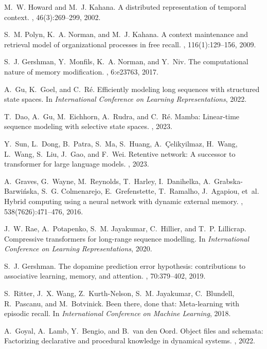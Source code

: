 \documentclass[11pt]{article}
\begin{document}

\begin{thebibliography}{20}

M.~W. Howard and M.~J. Kahana.
\newblock A distributed representation of temporal context.
, 46(3):269--299, 2002.

S.~M. Polyn, K.~A. Norman, and M.~J. Kahana.
\newblock A context maintenance and retrieval model of organizational processes in free recall.
, 116(1):129--156, 2009.

S.~J. Gershman, Y.~Monfils, K.~A. Norman, and Y.~Niv.
\newblock The computational nature of memory modification.
, 6:e23763, 2017.

A.~Gu, K.~Goel, and C.~R{\'e}.
\newblock Efficiently modeling long sequences with structured state spaces.
\newblock In {\em International Conference on Learning Representations}, 2022.

T.~Dao, A.~Gu, M.~Eichhorn, A.~Rudra, and C.~R{\'e}.
\newblock Mamba: Linear-time sequence modeling with selective state spaces.
, 2023.

Y.~Sun, L.~Dong, B.~Patra, S.~Ma, S.~Huang, A.~Çelikyilmaz, H.~Wang, L.~Wang, S.~Liu, J.~Gao, and F.~Wei.
\newblock Retentive network: A successor to transformer for large language models.
, 2023.

A.~Graves, G.~Wayne, M.~Reynolds, T.~Harley, I.~Danihelka, A.~Grabska-Barwińska, S.~G. Colmenarejo, E.~Grefenstette, T.~Ramalho, J.~Agapiou, et~al.
\newblock Hybrid computing using a neural network with dynamic external memory.
, 538(7626):471--476, 2016.

J.~W. Rae, A.~Potapenko, S.~M. Jayakumar, C.~Hillier, and T.~P. Lillicrap.
\newblock Compressive transformers for long-range sequence modelling.
\newblock In {\em International Conference on Learning Representations}, 2020.

S.~J. Gershman.
\newblock The dopamine prediction error hypothesis: contributions to associative learning, memory, and attention.
, 70:379--402, 2019.

S.~Ritter, J.~X. Wang, Z.~Kurth-Nelson, S.~M. Jayakumar, C.~Blundell, R.~Pascanu, and M.~Botvinick.
\newblock Been there, done that: Meta-learning with episodic recall.
\newblock In {\em International Conference on Machine Learning}, 2018.

A.~Goyal, A.~Lamb, Y.~Bengio, and B.~van den Oord.
\newblock Object files and schemata: Factorizing declarative and procedural knowledge in dynamical systems.
, 2022.

\end{thebibliography}
\end{document}
